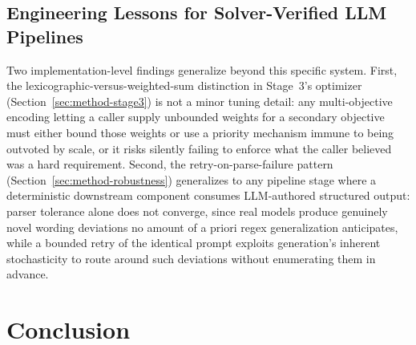 \documentclass[preprint,12pt,authoryear]{elsarticle}
\renewcommand{\_}{\textunderscore\allowbreak{}}
\begin{document}
\subsection{Engineering Lessons for Solver-Verified LLM Pipelines}

Two implementation-level findings generalize beyond this specific system. First, the lexicographic-versus-weighted-sum distinction in Stage~3's optimizer (Section~\ref{sec:method-stage3}) is not a minor tuning detail: any multi-objective encoding letting a caller supply unbounded weights for a secondary objective must either bound those weights or use a priority mechanism immune to being outvoted by scale, or it risks silently failing to enforce what the caller believed was a hard requirement. Second, the retry-on-parse-failure pattern (Section~\ref{sec:method-robustness}) generalizes to any pipeline stage where a deterministic downstream component consumes LLM-authored structured output: parser tolerance alone does not converge, since real models produce genuinely novel wording deviations no amount of a priori regex generalization anticipates, while a bounded retry of the identical prompt exploits generation's inherent stochasticity to route around such deviations without enumerating them in advance.

\section{Conclusion}
\label{sec:conclusion}
\end{document}

